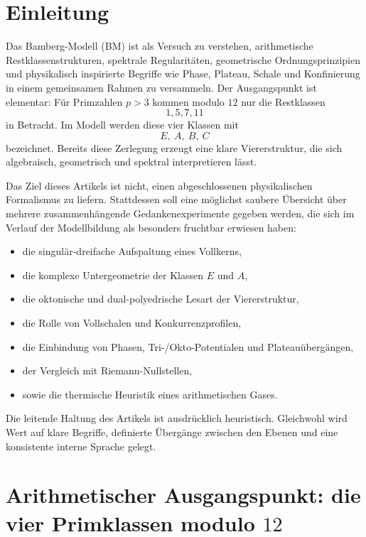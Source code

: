 \documentclass[11pt,a4paper]{article}
\theoremstyle{definition}
\theoremstyle{plain}
\begin{document}
	\tableofcontents
	
	\section{Einleitung}
	
	Das Bamberg-Modell (BM) ist als Versuch zu verstehen, arithmetische Restklassenstrukturen, spektrale Regularitäten, geometrische Ordnungsprinzipien und physikalisch inspirierte Begriffe wie Phase, Plateau, Schale und Konfinierung in einem gemeinsamen Rahmen zu versammeln. Der Ausgangspunkt ist elementar: Für Primzahlen $p>3$ kommen modulo $12$ nur die Restklassen
	\[
	1,5,7,11
	\]
	in Betracht. Im Modell werden diese vier Klassen mit
	\[
	E,\ A,\ B,\ C
	\]
	bezeichnet. Bereits diese Zerlegung erzeugt eine klare Viererstruktur, die sich algebraisch, geometrisch und spektral interpretieren lässt.
	
	Das Ziel dieses Artikels ist nicht, einen abgeschlossenen physikalischen Formalismus zu liefern. Stattdessen soll eine möglichst saubere Übersicht über mehrere zusammenhängende Gedankenexperimente gegeben werden, die sich im Verlauf der Modellbildung als besonders fruchtbar erwiesen haben:
	\begin{itemize}[leftmargin=2em]
		\item die singulär-dreifache Aufspaltung eines Vollkerns,
		\item die komplexe Untergeometrie der Klassen $E$ und $A$,
		\item die oktonische und dual-polyedrische Lesart der Viererstruktur,
		\item die Rolle von Vollschalen und Konkurrenzprofilen,
		\item die Einbindung von Phasen, Tri-/Okto-Potentialen und Plateauübergängen,
		\item der Vergleich mit Riemann-Nullstellen,
		\item sowie die thermische Heuristik eines arithmetischen Gases.
	\end{itemize}
	
	Die leitende Haltung des Artikels ist ausdrücklich heuristisch. Gleichwohl wird Wert auf klare Begriffe, definierte Übergänge zwischen den Ebenen und eine konsistente interne Sprache gelegt.
	
	\section{Arithmetischer Ausgangspunkt: die vier Primklassen modulo $12$}
	
\end{document}
